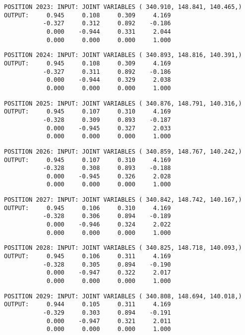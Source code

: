 \begin{verbatim}
POSITION 2023: INPUT: JOINT VARIABLES ( 340.910, 148.841, 140.465,)
OUTPUT:     0.945     0.108     0.309     4.169
           -0.327     0.312     0.892    -0.186
            0.000    -0.944     0.331     2.044
            0.000     0.000     0.000     1.000
\end{verbatim} \pagebreak[1]\begin{verbatim}
POSITION 2024: INPUT: JOINT VARIABLES ( 340.893, 148.816, 140.391,)
OUTPUT:     0.945     0.108     0.309     4.169
           -0.327     0.311     0.892    -0.186
            0.000    -0.944     0.329     2.038
            0.000     0.000     0.000     1.000
\end{verbatim} \pagebreak[1]\begin{verbatim}
POSITION 2025: INPUT: JOINT VARIABLES ( 340.876, 148.791, 140.316,)
OUTPUT:     0.945     0.107     0.310     4.169
           -0.328     0.309     0.893    -0.187
            0.000    -0.945     0.327     2.033
            0.000     0.000     0.000     1.000
\end{verbatim} \pagebreak[1]\begin{verbatim}
POSITION 2026: INPUT: JOINT VARIABLES ( 340.859, 148.767, 140.242,)
OUTPUT:     0.945     0.107     0.310     4.169
           -0.328     0.308     0.893    -0.188
            0.000    -0.945     0.326     2.028
            0.000     0.000     0.000     1.000
\end{verbatim} \pagebreak[1]\begin{verbatim}
POSITION 2027: INPUT: JOINT VARIABLES ( 340.842, 148.742, 140.167,)
OUTPUT:     0.945     0.106     0.310     4.169
           -0.328     0.306     0.894    -0.189
            0.000    -0.946     0.324     2.022
            0.000     0.000     0.000     1.000
\end{verbatim} \pagebreak[1]\begin{verbatim}
POSITION 2028: INPUT: JOINT VARIABLES ( 340.825, 148.718, 140.093,)
OUTPUT:     0.945     0.106     0.311     4.169
           -0.328     0.305     0.894    -0.190
            0.000    -0.947     0.322     2.017
            0.000     0.000     0.000     1.000
\end{verbatim} \pagebreak[1]\begin{verbatim}
POSITION 2029: INPUT: JOINT VARIABLES ( 340.808, 148.694, 140.018,)
OUTPUT:     0.944     0.105     0.311     4.169
           -0.329     0.303     0.894    -0.191
            0.000    -0.947     0.321     2.011
            0.000     0.000     0.000     1.000
\end{verbatim} \pagebreak[1]\begin{verbatim}

\end{verbatim}

